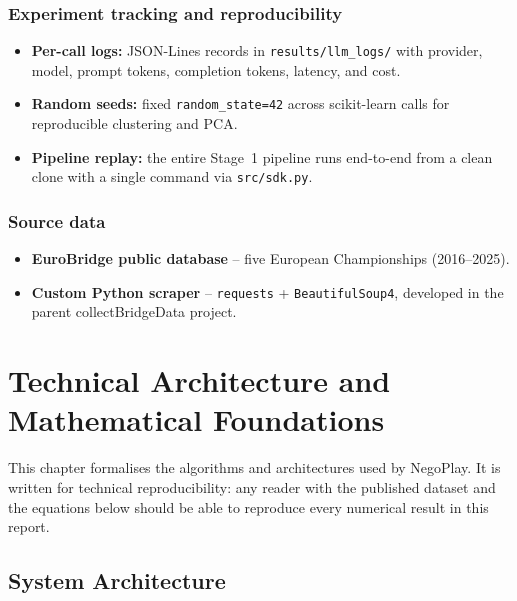 \documentclass[11pt, a4paper, oneside, openany]{report}
\begin{document}
\subsection*{Experiment tracking and reproducibility}
\begin{itemize}[leftmargin=*]
    \item \textbf{Per-call logs:} JSON-Lines records in \texttt{results/llm\_logs/} with provider, model, prompt tokens, completion tokens, latency, and cost.
    \item \textbf{Random seeds:} fixed \texttt{random\_state=42} across scikit-learn calls for reproducible clustering and PCA.
    \item \textbf{Pipeline replay:} the entire Stage~1 pipeline runs end-to-end from a clean clone with a single command via \texttt{src/sdk.py}.
\end{itemize}

\subsection*{Source data}
\begin{itemize}[leftmargin=*]
    \item \textbf{EuroBridge public database} -- five European Championships (2016--2025).
    \item \textbf{Custom Python scraper} -- \texttt{requests} + \texttt{BeautifulSoup4}, developed in the parent collectBridgeData project.
\end{itemize}

\chapter{Technical Architecture and Mathematical Foundations}
\label{ch:tech}

This chapter formalises the algorithms and architectures used by NegoPlay. It is written for technical reproducibility: any reader with the published dataset and the equations below should be able to reproduce every numerical result in this report.

\section{System Architecture}
\label{sec:sys_arch}
\end{document}

